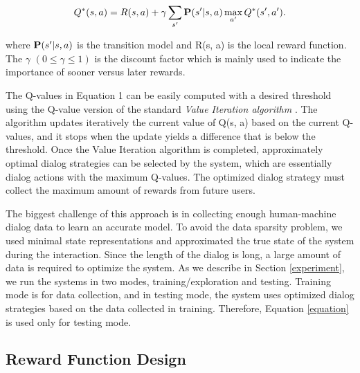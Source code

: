 \begin{sloppy}
\begin{equation}
Q^*(s,a)= R(s, a) + \gamma \sum_{s'} {\bf P}(s' | s, a) \max_{a'}Q^*(s', a').
\label{equation}
\end{equation}

where ${\bf P}(s' | s, a)$ is the transition model and R(s, a) is the local reward function. The $\gamma$  $ (0 \le \gamma \le 1) $ is the discount factor which is mainly used to indicate the importance of sooner versus later rewards. 

The Q-values in Equation 1 can be easily computed with a desired threshold using the Q-value version of the standard {\em Value Iteration algorithm} \cite{sutton1998reinforcement}.  The algorithm updates iteratively the current value of Q(s, a) based on the current Q-values, and it stops when the update yields a difference that is below the threshold. Once the Value Iteration algorithm is completed, approximately optimal dialog strategies can be selected by the system, which are essentially dialog actions with the maximum Q-values. The optimized dialog strategy must collect the maximum amount of rewards from future users. 

The biggest challenge of this approach is in collecting enough human-machine dialog data to learn an accurate model. To avoid the data sparsity problem, we used minimal state representations and approximated the true state of the system during the interaction. Since the length of the dialog is long, a large amount of data is required to optimize the system. As we describe in Section \ref{experiment}, we run the systems in two modes, training/exploration and testing. Training mode is for data collection, and in testing mode, the system uses optimized dialog strategies based on the data collected in training. Therefore, Equation \ref{equation} is used only for testing mode.

\subsection{Reward Function Design}
\label{Reward}


\end{sloppy}
